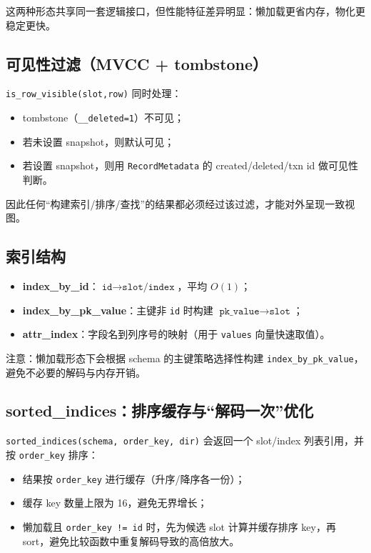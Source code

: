 这两种形态共享同一套逻辑接口，但性能特征差异明显：懒加载更省内存，物化更稳定更快。

\subsection{可见性过滤（MVCC + tombstone）}

\texttt{is\_row\_visible(slot,row)} 同时处理：

\begin{itemize}
  \item tombstone（\texttt{\_\_deleted=1}）不可见；
  \item 若未设置 snapshot，则默认可见；
  \item 若设置 snapshot，则用 \texttt{RecordMetadata} 的 created/deleted/txn id 做可见性判断。
\end{itemize}

因此任何“构建索引/排序/查找”的结果都必须经过该过滤，才能对外呈现一致视图。

\subsection{索引结构}

\begin{itemize}
  \item \textbf{index\_by\_id}：\(\texttt{id} \rightarrow \texttt{slot/index}\)，平均 \(O(1)\)；
  \item \textbf{index\_by\_pk\_value}：主键非 \texttt{id} 时构建 \(\texttt{pk\_value} \rightarrow \texttt{slot}\)；
  \item \textbf{attr\_index}：字段名到列序号的映射（用于 \texttt{values} 向量快速取值）。
\end{itemize}

注意：懒加载形态下会根据 schema 的主键策略选择性构建 \texttt{index\_by\_pk\_value}，避免不必要的解码与内存开销。

\subsection{sorted\_indices：排序缓存与“解码一次”优化}

\texttt{sorted\_indices(schema, order\_key, dir)} 会返回一个 slot/index 列表引用，并按 \texttt{order\_key} 排序：

\begin{itemize}
  \item 结果按 \texttt{order\_key} 进行缓存（升序/降序各一份）；
  \item 缓存 key 数量上限为 16，避免无界增长；
  \item 懒加载且 \texttt{order\_key != id} 时，先为候选 slot 计算并缓存排序 key，再 sort，避免比较函数中重复解码导致的高倍放大。
\end{itemize}

